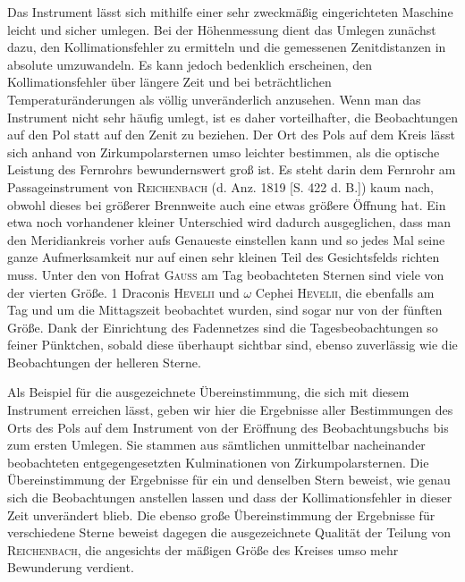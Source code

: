 Das Instrument lässt sich mithilfe einer sehr zweckmäßig eingerichteten Maschine leicht und sicher umlegen. Bei der Höhenmessung dient das Umlegen zunächst dazu, den Kollimationsfehler zu ermitteln und die gemessenen Zenitdistanzen in absolute umzuwandeln. Es kann jedoch bedenklich erscheinen, den Kollimationsfehler über längere Zeit und bei beträchtlichen Temperaturänderungen als völlig unveränderlich anzusehen. Wenn man das Instrument nicht sehr häufig umlegt, ist es daher vorteilhafter, die Beobachtungen auf den Pol statt auf den Zenit zu beziehen. Der Ort des Pols auf dem Kreis lässt sich anhand von Zirkumpolarsternen umso leichter bestimmen, als die optische Leistung des Fernrohrs bewundernswert groß ist. Es steht darin dem Fernrohr am Passageinstrument von \textsc{Reichenbach} (d. Anz. 1819 [S. 422 d. B.]) kaum nach, obwohl dieses bei größerer Brennweite auch eine etwas größere Öffnung hat. Ein etwa noch vorhandener kleiner Unterschied wird dadurch ausgeglichen, dass man den Meridiankreis vorher aufs Genaueste einstellen kann und so jedes Mal seine ganze Aufmerksamkeit nur auf einen sehr kleinen Teil des Gesichtsfelds richten muss. Unter den von Hofrat \textsc{Gauss} am Tag beobachteten Sternen sind viele von der vierten Größe. 1 Draconis \textsc{Hevelii} und $\omega$ Cephei \textsc{Hevelii}, die ebenfalls am Tag und um die Mittagszeit beobachtet wurden, sind sogar nur von der fünften Größe. Dank der Einrichtung des Fadennetzes sind die Tagesbeobachtungen so feiner Pünktchen, sobald diese überhaupt sichtbar sind, ebenso zuverlässig wie die Beobachtungen der helleren Sterne.

Als Beispiel für die ausgezeichnete Übereinstimmung, die sich mit diesem Instrument erreichen lässt, geben wir hier die Ergebnisse aller Bestimmungen des Orts des Pols auf dem Instrument von der Eröffnung des Beobachtungsbuchs bis zum ersten Umlegen. Sie stammen aus sämtlichen unmittelbar nacheinander beobachteten entgegengesetzten Kulminationen von Zirkumpolarsternen. Die Übereinstimmung der Ergebnisse für ein und denselben Stern beweist, wie genau sich die Beobachtungen anstellen lassen und dass der Kollimationsfehler in dieser Zeit unverändert blieb. Die ebenso große Übereinstimmung der Ergebnisse für verschiedene Sterne beweist dagegen die ausgezeichnete Qualität der Teilung von \textsc{Reichenbach}, die angesichts der mäßigen Größe des Kreises umso mehr Bewunderung verdient.

